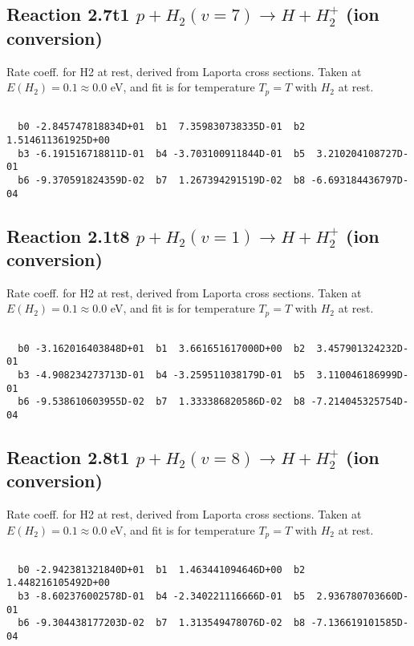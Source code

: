 \documentclass[12pt,dvipdfmx]{article}
\begin{document}
\newpage
\subsection{
Reaction 2.7t1
$ p + H_2(v=7) \rightarrow H + H_2^+$ (ion conversion)
}
Rate coeff. for H2 at rest, derived from Laporta cross sections.
Taken at $E(H_2) = 0.1 \approx 0.0$ eV,  and fit is for temperature $T_p=T$ with $H_2$ at rest.

\begin{small}\begin{verbatim}

  b0 -2.845747818834D+01  b1  7.359830738335D-01  b2  1.514611361925D+00
  b3 -6.191516718811D-01  b4 -3.703100911844D-01  b5  3.210204108727D-01
  b6 -9.370591824359D-02  b7  1.267394291519D-02  b8 -6.693184436797D-04

\end{verbatim}\end{small}

\newpage
\subsection{
Reaction 2.1t8
$ p + H_2(v=1) \rightarrow H + H_2^+$ (ion conversion)
}
Rate coeff. for H2 at rest, derived from Laporta cross sections.
Taken at $E(H_2) = 0.1 \approx 0.0$ eV,  and fit is for temperature $T_p=T$ with $H_2$ at rest.

\begin{small}\begin{verbatim}

  b0 -3.162016403848D+01  b1  3.661651617000D+00  b2  3.457901324232D-01
  b3 -4.908234273713D-01  b4 -3.259511038179D-01  b5  3.110046186999D-01
  b6 -9.538610603955D-02  b7  1.333386820586D-02  b8 -7.214045325754D-04

\end{verbatim}\end{small}

\newpage
\subsection{
Reaction 2.8t1
$ p + H_2(v=8) \rightarrow H + H_2^+$ (ion conversion)
}
Rate coeff. for H2 at rest, derived from Laporta cross sections.
Taken at $E(H_2) = 0.1 \approx 0.0$ eV,  and fit is for temperature $T_p=T$ with $H_2$ at rest.

\begin{small}\begin{verbatim}

  b0 -2.942381321840D+01  b1  1.463441094646D+00  b2  1.448216105492D+00
  b3 -8.602376002578D-01  b4 -2.340221116666D-01  b5  2.936780703660D-01
  b6 -9.304438177203D-02  b7  1.313549478076D-02  b8 -7.136619101585D-04

\end{verbatim}\end{small}
\end{document}
